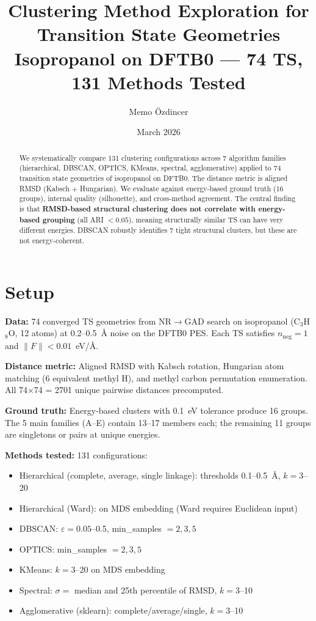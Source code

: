 \documentclass[11pt]{article}
\title{Clustering Method Exploration for Transition State Geometries\\[0.3em]
\large Isopropanol on DFTB0 --- 74 TS, 131 Methods Tested}
\author{Memo \"Ozdincer}
\date{March 2026}
\begin{document}
\maketitle

\begin{abstract}
We systematically compare 131 clustering configurations across 7 algorithm families
(hierarchical, DBSCAN, OPTICS, KMeans, spectral, agglomerative) applied to 74
transition state geometries of isopropanol on DFTB0.
The distance metric is aligned RMSD (Kabsch + Hungarian).
We evaluate against energy-based ground truth (16 groups), internal quality (silhouette),
and cross-method agreement.
The central finding is that \textbf{RMSD-based structural clustering does not correlate
with energy-based grouping} (all ARI $< 0.05$), meaning structurally similar TS can
have very different energies.
DBSCAN robustly identifies 7 tight structural clusters, but these are not energy-coherent.
\end{abstract}

\section{Setup}

\textbf{Data:} 74 converged TS geometries from NR$\to$GAD search on isopropanol (C$_3$H$_8$O, 12 atoms)
at 0.2--0.5~\AA{} noise on the DFTB0 PES. Each TS satisfies $n_{\text{neg}} = 1$ and
$\|F\| < 0.01$~eV/\AA.

\textbf{Distance metric:} Aligned RMSD with Kabsch rotation, Hungarian atom matching
(6 equivalent methyl H), and methyl carbon permutation enumeration.
All 74$\times$74 = 2701 unique pairwise distances precomputed.

\textbf{Ground truth:} Energy-based clusters with 0.1~eV tolerance produce 16 groups.
The 5 main families (A--E) contain 13--17 members each; the remaining 11 groups are singletons or pairs at unique energies.

\textbf{Methods tested:} 131 configurations:
\begin{itemize}
  \item Hierarchical (complete, average, single linkage): thresholds 0.1--0.5~\AA, $k = 3$--20
  \item Hierarchical (Ward): on MDS embedding (Ward requires Euclidean input)
  \item DBSCAN: $\varepsilon = 0.05$--0.5, min\_samples $= 2, 3, 5$
  \item OPTICS: min\_samples $= 2, 3, 5$
  \item KMeans: $k = 3$--20 on MDS embedding
  \item Spectral: $\sigma = $ median and 25th percentile of RMSD, $k = 3$--10
  \item Agglomerative (sklearn): complete/average/single, $k = 3$--10
\end{itemize}
\end{document}
